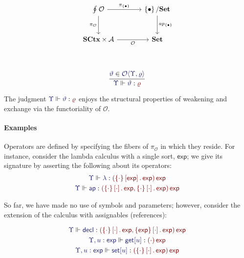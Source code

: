 \documentclass[11pt]{article}
\theoremstyle{definition}
\theoremstyle{remark}
\numberwithin{equation}{section}
\def\IModeColorName{MidnightBlue}
\def\OModeColorName{Maroon}
\newcommand\IMode[1]{{\color{\IModeColorName}{#1}}}
\newcommand\OMode[1]{{\color{\OModeColorName}{#1}}}
\newcommand\MkSet[1]{\left\{#1\right\}}
\newcommand\Member[2]{\IMode{#1}\in\IMode{#2}}
\newcommand\MkValence[3]{\left\{#1\right\}\left[#2\right].\, #3}
\newcommand\MkArity[2]{\left(#1\right) #2}
\newcommand\Arities{\mathcal{A}}
\newcommand\Operators{\mathcal{O}}
\newcommand\Sets{\mathbf{Set}}
\newcommand\SCtx{\mathbf{SCtx}}
\newcommand\IsOperator[3]{\IMode{#1}\Vdash \IMode{#2} : \OMode{#3}}
\newcommand\Grothendieck[2]{\oint^{#1} #2#1}
\newcommand\Singleton{\MkSet{\bullet}}
\newcommand\SortExp{\mathsf{exp}}
\begin{document}
\[
\begin{tikzcd}[ampersand replacement = \&, sep = large]
  {\Grothendieck{}{\Operators}}
    \arrow[r, "{\pi_{\Singleton}}"]
    \arrow[d, "{\pi_{\Operators}}" left]
  \& {\Singleton / \Sets}
    \arrow[d, "{ap_{\Singleton}}"] \\
  {\SCtx\times\Arities}
     \arrow[r, "{\Operators}" below]
  \& {\Sets} \\
\end{tikzcd}
\]

\[
  \infer{
    \IsOperator{\Upsilon}{\vartheta}{\varrho}
  }{
    \Member{\vartheta}{\Operators\langle\Upsilon,\varrho\rangle}
  }
\]

The judgment $\IsOperator{\Upsilon}{\vartheta}{\varrho}$ enjoys the structural
properties of weakening and exchange via the functoriality of
$\Operators$.

\paragraph{Examples}

Operators are defined by specifying the fibers of $\pi_{\Operators}$ in which
they reside. For instance, consider the lambda calculus with a single sort,
$\SortExp$; we give its signature by asserting the following about its
operators:
\begin{gather*}
  \IsOperator{\Upsilon}{\lambda}{
    \MkArity{\MkValence{\cdot}{\SortExp}{\SortExp}}{\SortExp}
  }\\
  \IsOperator{\Upsilon}{\mathsf{ap}}{
    \MkArity{
      \MkValence{\cdot}{\cdot}{\SortExp},
      \MkValence{\cdot}{\cdot}{\SortExp}
    }{\SortExp}
  }
\end{gather*}

So far, we have made no use of symbols and parameters; however, consider the
extension of the calculus with assignables (references):

\begin{gather*}
  \IsOperator{\Upsilon}{\mathsf{decl}}{
    \MkArity{
      \MkValence{\cdot}{\cdot}{\SortExp},
      \MkValence{\SortExp}{\cdot}{\SortExp}
    }{
      \SortExp
    }
  }\\
  \IsOperator{\Upsilon,u:\SortExp}{\mathsf{get}[u]}{
    \MkArity{
      \cdot
    }{
      \SortExp
    }
  }\\
  \IsOperator{\Upsilon,u:\SortExp}{\mathsf{set}[u]}{
    \MkArity{
      \MkValence{\cdot}{\cdot}{\SortExp}
    }{
      \SortExp
    }
  }
\end{gather*}
\end{document}
